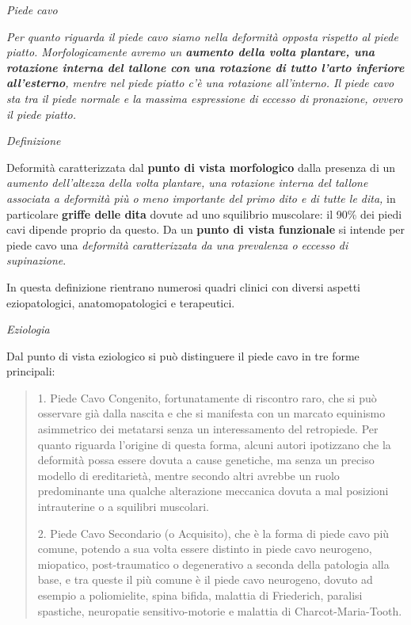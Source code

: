 \documentclass[]{article}
\date{}
\begin{document}
\emph{Piede cavo}

\emph{Per quanto riguarda il piede cavo siamo nella deformità opposta
rispetto al piede piatto. Morfologicamente avremo un
\textbf{\emph{aumento della volta plantare, una rotazione interna del
tallone con una rotazione di tutto l'arto inferiore all'esterno}},
mentre nel piede piatto c'è una rotazione all'interno. Il piede cavo sta
tra il piede normale e la massima espressione di eccesso di pronazione,
ovvero il piede piatto.}

\emph{Definizione}

Deformità caratterizzata dal \textbf{punto di vista morfologico} dalla
presenza di un \emph{aumento dell'altezza della volta plantare, una
rotazione interna del tallone associata a deformità più o meno
importante del primo dito e di tutte le dita,} in particolare
\textbf{griffe delle dita} dovute ad uno squilibrio muscolare: il 90\%
dei piedi cavi dipende proprio da questo. Da un \textbf{punto di vista
funzionale} si intende per piede cavo una \emph{deformità caratterizzata
da una prevalenza o eccesso di supinazione}.

In questa definizione rientrano numerosi quadri clinici con diversi
aspetti eziopatologici, anatomopatologici e terapeutici.

\emph{Eziologia}

Dal punto di vista eziologico si può distinguere il piede cavo in tre
forme principali:

\begin{quote}
1. Piede Cavo Congenito, fortunatamente di riscontro raro, che si può
osservare già dalla nascita e che si manifesta con un marcato equinismo
asimmetrico dei metatarsi senza un interessamento del retropiede. Per
quanto riguarda l'origine di questa forma, alcuni autori ipotizzano che
la deformità possa essere dovuta a cause genetiche, ma senza un preciso
modello di ereditarietà, mentre secondo altri avrebbe un ruolo
predominante una qualche alterazione meccanica dovuta a mal posizioni
intrauterine o a squilibri muscolari.

2. Piede Cavo Secondario (o Acquisito), che è la forma di piede cavo più
comune, potendo a sua volta essere distinto in piede cavo neurogeno,
miopatico, post-traumatico o degenerativo a seconda della patologia alla
base, e tra queste il più comune è il piede cavo neurogeno, dovuto ad
esempio a poliomielite, spina bifida, malattia di Friederich, paralisi
spastiche, neuropatie sensitivo-motorie e malattia di
Charcot-Maria-Tooth.
\end{quote}
\end{document}

